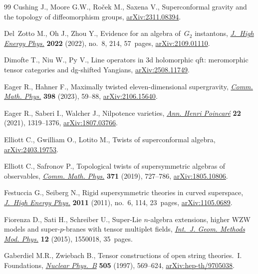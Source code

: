 \documentclass[10pt,a4paper]{amsart}
\numberwithin{equation}{section}
\theoremstyle{definition}
\begin{document}
\begin{thebibliography}{99}
Cushing J., Moore G.W., Ro{\v{c}}ek M., Saxena V., Superconformal gravity and
 the topology of diffeomorphism groups,
 \href{http://arxiv.org/abs/2311.08394}{arXiv:2311.08394}.

Del~Zotto M., Oh J., Zhou Y., Evidence for an algebra of~{$G_2$} instantons,
 \href{https://doi.org/10.1007/jhep08(2022)214}{\textit{J.~High Energy Phys.}}
 \textbf{2022} (2022), no.~8, 214, 57~pages,
 \href{http://arxiv.org/abs/2109.01110}{arXiv:2109.01110}.

Dimofte T., Niu W., Py V., Line operators in 3d holomorphic qft: meromorphic
 tensor categories and dg-shifted {Y}angians,
 \href{http://arxiv.org/abs/2508.11749}{arXiv:2508.11749}.

Eager R., Hahner F., Maximally twisted eleven-dimensional supergravity,
 \href{https://doi.org/10.1007/s00220-022-04516-5}{\textit{Comm. Math. Phys.}}
 \textbf{398} (2023), 59--88,
 \href{http://arxiv.org/abs/2106.15640}{arXiv:2106.15640}.

Eager R., Saberi I., Walcher J., Nilpotence varieties,
 \href{https://doi.org/10.1007/s00023-020-01007-y}{\textit{Ann. Henri
 Poincar\'e}} \textbf{22} (2021), 1319--1376,
 \href{http://arxiv.org/abs/1807.03766}{arXiv:1807.03766}.

Elliott C., Gwilliam O., Lotito M., Twists of superconformal algebra,
 \href{http://arxiv.org/abs/2403.19753}{arXiv:2403.19753}.

Elliott C., Safronov P., Topological twists of supersymmetric algebras of
 observables, \href{https://doi.org/10.1007/s00220-019-03393-9}{\textit{Comm.
 Math. Phys.}} \textbf{371} (2019), 727--786,
 \href{http://arxiv.org/abs/1805.10806}{arXiv:1805.10806}.

Festuccia G., Seiberg N., Rigid supersymmetric theories in curved superspace,
 \href{https://doi.org/10.1007/JHEP06(2011)114}{\textit{J.~High Energy Phys.}}
 \textbf{2011} (2011), no.~6, 114, 23~pages,
 \href{http://arxiv.org/abs/1105.0689}{arXiv:1105.0689}.

Fiorenza D., Sati H., Schreiber U., Super-{L}ie {$n$}-algebra extensions,
 higher {WZW} models and super-{$p$}-branes with tensor multiplet fields,
 \href{https://doi.org/10.1142/S0219887815500188}{\textit{Int.~J. Geom.
 Methods Mod. Phys.}} \textbf{12} (2015), 1550018, 35~pages.

Gaberdiel M.R., Zwiebach B., Tensor constructions of open string theories.~{I}.
 {F}oundations,
 \href{https://doi.org/10.1016/S0550-3213(97)00580-4}{\textit{Nuclear
 Phys.~B}} \textbf{505} (1997), 569--624,
 \href{http://arxiv.org/abs/hep-th/9705038}{arXiv:hep-th/9705038}.


\end{thebibliography}
\end{document}
